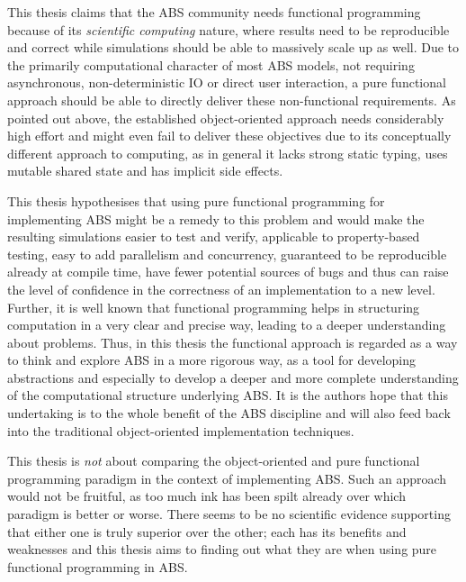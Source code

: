 \medskip

This thesis claims that the ABS community needs functional programming because of its \textit{scientific computing} nature, where results need to be reproducible and correct while simulations should be able to massively scale up as well. Due to the primarily computational character of most ABS models, not requiring asynchronous, non-deterministic IO or direct user interaction, a pure functional approach should be able to directly deliver these non-functional requirements. As pointed out above, the established object-oriented approach needs considerably high effort and might even fail to deliver these objectives due to its conceptually different approach to computing, as in general it lacks strong static typing, uses mutable shared state and has implicit side effects. 

This thesis hypothesises that using pure functional programming for implementing ABS might be a remedy to this problem and would make the resulting simulations easier to test and verify, applicable to property-based testing, easy to add parallelism and concurrency, guaranteed to be reproducible already at compile time, have fewer potential sources of bugs and thus can raise the level of confidence in the correctness of an implementation to a new level. Further, it is well known that functional programming helps in structuring computation in a very clear and precise way, leading to a deeper understanding about problems. Thus, in this thesis the functional approach is regarded as a way to think and explore ABS in a more rigorous way, as a tool for developing abstractions and especially to develop a deeper and more complete understanding of the computational structure underlying ABS. %
It is the authors hope that this undertaking is to the whole benefit of the ABS discipline and will also feed back into the traditional object-oriented implementation techniques.

This thesis is \textit{not} about comparing the object-oriented and pure functional programming paradigm in the context of implementing ABS. Such an approach would not be fruitful, as too much ink has been spilt already over which paradigm is better or worse. There seems to be no scientific evidence supporting that either one is truly superior over the other; each has its benefits and weaknesses and this thesis aims to finding out what they are when using pure functional programming in ABS.

